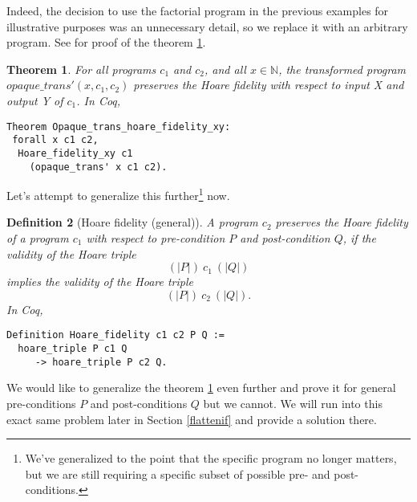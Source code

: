 \documentclass[compsoc,conference,a4paper,10pt,times]{IEEEtran}
\newtheorem{theorem}{Theorem}[section]
\newtheorem{defin}[theorem]{Definition}
\begin{document}
Indeed, the decision to use the factorial program in the previous examples for illustrative purposes was an unnecessary detail, so we replace it with an arbitrary program. See  \cite{Weyun} for proof of the theorem \ref{hoare_xy_main}.

\begin{theorem}\label{hoare_xy_main}
For all programs $c_1$ and $c_2$, and all $x \in \mathbb{N}$, the transformed program $opaque\_trans'(x, c_1, c_2)$ preserves the Hoare fidelity with respect to input X and output Y of $c_1$.  
In Coq, \begin{verbatim}
Theorem Opaque_trans_hoare_fidelity_xy: 
 forall x c1 c2,
  Hoare_fidelity_xy c1 
    (opaque_trans' x c1 c2).
\end{verbatim}
\end{theorem}

Let's attempt to generalize this further\footnote{We've generalized to the point that the specific program no longer matters, but we are still requiring a specific subset of possible pre- and post-conditions.} now.

\begin{defin}[Hoare fidelity (general)]
A program $c_2$ preserves the Hoare fidelity of a program $c_1$ with respect to pre-condition $P$ and post-condition $Q$, if the validity of the Hoare triple
\[
(| P |)\ c_1\ (| Q |)
\]
implies the validity of the Hoare triple
\[
(| P |)\ c_2\ (| Q |).
\]
In Coq,
\begin{verbatim}
Definition Hoare_fidelity c1 c2 P Q :=
  hoare_triple P c1 Q 
     -> hoare_triple P c2 Q.
\end{verbatim}
\end{defin}

We would like to generalize the theorem \ref{hoare_xy_main} even further and prove it for general pre-conditions $P$ and post-conditions $Q$ but we cannot. We will run into this exact same problem later in Section \ref{flattenif} and provide a solution there.  
\end{document}
